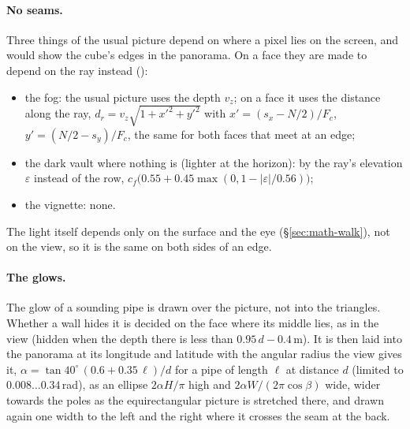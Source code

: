 \paragraph{No seams.} Three things of the usual picture depend on where a pixel lies on the screen, and would
show the cube's edges in the panorama. On a face they are made to depend on the ray instead
():
\begin{itemize}
  \item the fog: the usual picture uses the depth $v_z$; on a face it uses the distance along the ray,
        $d_r = v_z\sqrt{1 + x'^2 + y'^2}$ with $x' = (s_x - N/2)/F_c$, $y' = (N/2 - s_y)/F_c$, the same for both faces
        that meet at an edge;
  \item the dark vault where nothing is (lighter at the horizon): by the ray's elevation $\varepsilon$ instead of the
        row, $c_f\bigl(0.55 + 0.45\max(0, 1 - |\varepsilon|/0.56)\bigr)$;
  \item the vignette: none.
\end{itemize}
The light itself depends only on the surface and the eye (\S\ref{sec:math-walk}), not on the view, so it is the same
on both sides of an edge.

\paragraph{The glows.} The glow of a sounding pipe is drawn over the picture, not into the triangles. Whether a
wall hides it is decided on the face where its middle lies, as in the view (hidden when the depth there is less than
$0.95\,d - 0.4$\,m). It is then laid into the panorama at its longitude and latitude with the angular radius the view
gives it, $\alpha = \tan 40^\circ\,(0.6 + 0.35\,\ell)/d$ for a pipe of length $\ell$ at distance $d$ (limited to
$0.008 \dots 0.34$\,rad), as an ellipse $2\alpha H/\pi$ high and $2\alpha W/(2\pi\cos\beta)$ wide, wider towards
the poles as the equirectangular picture is stretched there, and drawn again one width to the left and the right where
it crosses the seam at the back.

